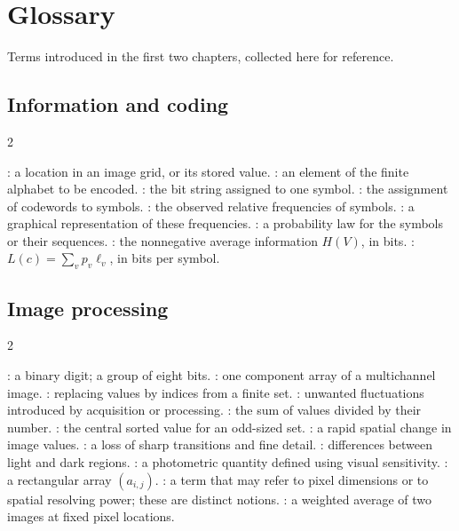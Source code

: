 \chapter*{Glossary}
Terms introduced in the first two chapters, collected here for reference.

\section*{Information and coding}
\begin{multicols}{2}\small\raggedright
\begin{rs}
: a location in an image grid, or its stored value.
: an element of the finite alphabet to be encoded.
: the bit string assigned to one symbol.
: the assignment of codewords to symbols.
: the observed relative frequencies of symbols.
: a graphical representation of these frequencies.
: a probability law for the symbols or their sequences.
: the nonnegative average information $H(V)$, in bits.
: $L(c)=\sum_vp_v\ell_v$, in bits per symbol.
\end{rs}
\end{multicols}

\section*{Image processing}
\begin{multicols}{2}\small\raggedright
\begin{rs}
: a binary digit; a group of eight bits.
: one component array of a multichannel image.
: replacing values by indices from a finite set.
: unwanted fluctuations introduced by acquisition or processing.
: the sum of values divided by their number.
: the central sorted value for an odd-sized set.
: a rapid spatial change in image values.
: a loss of sharp transitions and fine detail.
: differences between light and dark regions.
: a photometric quantity defined using visual sensitivity.
: a rectangular array $(a_{i,j})$.
: a term that may refer to pixel dimensions or to spatial resolving power; these are distinct notions.
: a weighted average of two images at fixed pixel locations.
\end{rs}
\end{multicols}
